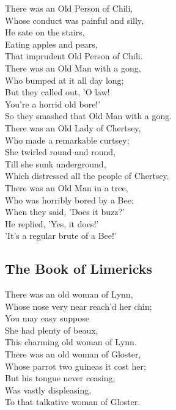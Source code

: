 There was an Old Person of Chili,\\
Whose conduct was painful and silly,\\
He sate on the stairs,\\
Eating apples and pears,\\
That imprudent Old Person of Chili.\\


There was an Old Man with a gong,\\
Who bumped at it all day long;\\
But they called out, 'O law!\\
You're a horrid old bore!'\\
So they smashed that Old Man with a gong.\\

There was an Old Lady of Chertsey,\\
Who made a remarkable curtsey;\\
She twirled round and round,\\
Till she sunk underground,\\
Which distressed all the people of Chertsey.\\

There was an Old Man in a tree,\\
Who was horribly bored by a Bee;\\
When they said, 'Does it buzz?'\\
He replied, 'Yes, it does!'\\
'It's a regular brute of a Bee!'\\

\subsection{The Book of Limericks}
\label{sec:book}
There was an old woman of Lynn,\\
Whose nose very near reach'd her chin;\\
You may easy suppose\\
She had plenty of beaux,\\
This charming old woman of Lynn.\\

There was an old woman of Gloster,\\
Whose parrot two guineas it cost her;\\
But his tongue never ceasing,\\
Was vastly displeasing,\\
To that talkative woman of Gloster.\\

